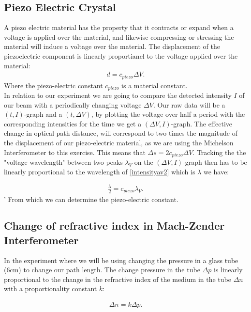 \subsection{Piezo Electric Crystal}
A piezo electric material has the property that it contracts or expand when a voltage is applied over the material, and likewise compressing or stressing the material will induce a voltage over the material. The displacement of the piezoelectric component is linearly proportianel to the voltage applied over the material:
%
\begin{align}
    d = c_{piezo}\Delta V.
\label{piezodisp}
\end{align}
%
Where the piezo-electric constant $c_{piezo}$ is a material constant.\\
%
In relation to our experiment we are going to compare the detected intensity $I$ of our beam with a periodically changing voltage $\Delta V$. Our raw data will be a $(t,I)$-graph and a $(t, \Delta V)$, by plotting the voltage over half a period with the corresponding intensities for the time we get a $(\Delta V,I)$-graph. The effective change in optical path distance, will correspond to two times the magnitude of the displacement of our piezo-electric material, as we are using the Michelson Interferometer to this exercise. This means that $\Delta s = 2 c_{piezo} \Delta V$. Tracking the the "voltage wavelength" between two peaks $\lambda_V$ on the $(\Delta V,I)$-graph then has to be linearly proportional to the wavelength of \ref{intensityav2} which is $\lambda$ we have:

\begin{align}
    \frac{\lambda}{2} = c_{piezo}\lambda_V.
\label{piezo}
\end{align}
'
From which we can determine the piezo-electric constant. 

\subsection{Change of refractive index in Mach-Zender Interferometer}

In the experiment where we will be using changing the pressure in a glass tube (6cm) to change our path length. The change pressure in the tube $\Delta p$ is linearly proportional to the change in the refractive index of the medium in the tube $\Delta n$ with a proportionality constant $k$:

\begin{align}
    \Delta n = k \Delta p.
\label{pn}
\end{align}

